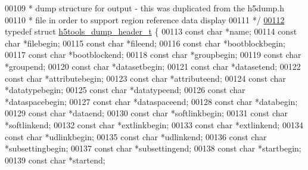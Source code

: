 \begin{DoxyCode}
{00109 \textcolor{comment}{ * dump structure for output - this was duplicated from the h5dump.h}
00110 \textcolor{comment}{ * file in order to support region reference data display}
00111 \textcolor{comment}{ */}
\hyperlink{structh5tools__dump__header__t}{00112} \textcolor{keyword}{typedef} \textcolor{keyword}{struct }\hyperlink{structh5tools__dump__header__t}{h5tools\_dump\_header\_t} \{
00113     \textcolor{keyword}{const} \textcolor{keywordtype}{char} *name;
00114     \textcolor{keyword}{const} \textcolor{keywordtype}{char} *filebegin;
00115     \textcolor{keyword}{const} \textcolor{keywordtype}{char} *fileend;
00116     \textcolor{keyword}{const} \textcolor{keywordtype}{char} *bootblockbegin;
00117     \textcolor{keyword}{const} \textcolor{keywordtype}{char} *bootblockend;
00118     \textcolor{keyword}{const} \textcolor{keywordtype}{char} *groupbegin;
00119     \textcolor{keyword}{const} \textcolor{keywordtype}{char} *groupend;
00120     \textcolor{keyword}{const} \textcolor{keywordtype}{char} *datasetbegin;
00121     \textcolor{keyword}{const} \textcolor{keywordtype}{char} *datasetend;
00122     \textcolor{keyword}{const} \textcolor{keywordtype}{char} *attributebegin;
00123     \textcolor{keyword}{const} \textcolor{keywordtype}{char} *attributeend;
00124     \textcolor{keyword}{const} \textcolor{keywordtype}{char} *datatypebegin;
00125     \textcolor{keyword}{const} \textcolor{keywordtype}{char} *datatypeend;
00126     \textcolor{keyword}{const} \textcolor{keywordtype}{char} *dataspacebegin;
00127     \textcolor{keyword}{const} \textcolor{keywordtype}{char} *dataspaceend;
00128     \textcolor{keyword}{const} \textcolor{keywordtype}{char} *databegin;
00129     \textcolor{keyword}{const} \textcolor{keywordtype}{char} *dataend;
00130     \textcolor{keyword}{const} \textcolor{keywordtype}{char} *softlinkbegin;
00131     \textcolor{keyword}{const} \textcolor{keywordtype}{char} *softlinkend;
00132     \textcolor{keyword}{const} \textcolor{keywordtype}{char} *extlinkbegin;
00133     \textcolor{keyword}{const} \textcolor{keywordtype}{char} *extlinkend;
00134     \textcolor{keyword}{const} \textcolor{keywordtype}{char} *udlinkbegin;
00135     \textcolor{keyword}{const} \textcolor{keywordtype}{char} *udlinkend;
00136     \textcolor{keyword}{const} \textcolor{keywordtype}{char} *subsettingbegin;
00137     \textcolor{keyword}{const} \textcolor{keywordtype}{char} *subsettingend;
00138     \textcolor{keyword}{const} \textcolor{keywordtype}{char} *startbegin;
00139     \textcolor{keyword}{const} \textcolor{keywordtype}{char} *startend;
}
\end{DoxyCode}
